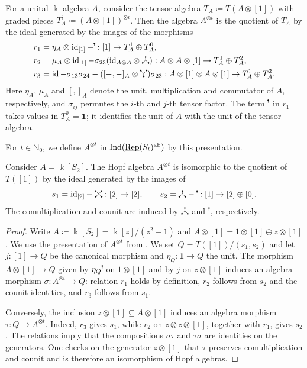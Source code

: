 \documentclass[11pt]{amsart}
\newcommand{\pd}[2][black]{\filldraw[#1] (#2) circle (1.5pt)} %
\newcommand\crossing{\tikz[baseline=(origin.base),scale=0.5]{
    \coordinate (origin) at (0,0); %
    \pd{0,0}; \pd{.5,0}; \pd{0,.5}; \pd{.5,.5};
    \draw (0,0) -- (.5,.5);
    \draw (.5,0) -- (0,.5);
}}
\newcommand\mult{\tikz[baseline=(origin.base),scale=0.5]{
    \coordinate (origin) at (0,0); %
    \pd{.25,0}; \pd{0,.5}; \pd{.5,.5};
    \draw (.25,0) -- (.25,.25) -- (0,.5);
    \draw (.25,.25) -- (.5,.5);
}}
\newcommand\comult{\tikz[baseline=(origin.base),scale=0.5]{
    \coordinate (origin) at (0,0); %
    \pd{.25,.5}; \pd{0,0}; \pd{.5,0};
    \draw (.25,.5) -- (.25,.25) -- (0,0);
    \draw (.25,.25) -- (.5,0);
}}
\newcommand\upperdots[1]{\tikz[baseline=(origin.base),scale=0.5]{
    \coordinate (origin) at (0,0);
    \foreach \i in {0,...,\numexpr#1-1\relax} {
        \pd{0.5*\i,.5};
        \draw (0.5*\i,.3) -- (0.5*\i,.5);
    }
}}
\newcommand\Cref[1]{\zcref[S]{#1}}
\theoremstyle{definition}
\theoremstyle{remark}
\newcommand\kk{\Bbbk}
\newcommand\uRep{\underline{\smash{\operatorname{Rep}}}}
\newcommand\id{\operatorname{id}}
\newcommand\Ind{\operatorname{Ind}}
\renewcommand\:\colon
\renewcommand\o\otimes
\newcommand\one{\mathbf{1}}
\newcommand\NN{\mathbb N}
\renewcommand\o\otimes
\renewcommand\:\colon
\newcommand\ab{^{\mathrm{ab}}}
\begin{document}
\begin{proposition} \label{p:gens-rels-tth-power}
    For a unital $\kk$-algebra $A$, consider the tensor algebra $T_A \coloneqq T(A \o [1])$ with graded pieces $T_A^i \coloneqq (A \o [1])^{\o i}$. Then
    the algebra $A^{\o t}$ is the quotient of $T_A$ by the ideal generated by the images of the morphisms
    \[\begin{aligned}
        &r_1 = \eta_A\o\id_{[1]}-\upperdots{1}: [1]\to T_A^1\oplus T_A^0, \\
        &r_2 = \mu_A \o \id_{[1]} - \sigma_{23}(\id_{A \o A} \o \;\comult) : A \o A \o [1] \to T_A^1 \oplus T_A^2, \\
        &r_3 = \id - \sigma_{13}\sigma_{24} - ([-,-]_A \o \mult)\sigma_{23} : A \o [1] \o A \o [1] \to T_A^1 \oplus T_A^2.
    \end{aligned}\]
    Here $\eta_A$, $\mu_A$ and $[,]_A$ denote the unit, multiplication and commutator of $A$, respectively, and $\sigma_{ij}$ permutes the $i$-th and $j$-th tensor factor. The term $\upperdots{1}$ in $r_1$ takes values in $T_A^0=\one$; it identifies the unit of $A$ with the unit of the tensor algebra.
\end{proposition}

For $t\in\NN_0$, we define $A^{\o t}$ in $\Ind(\uRep(S_t)\ab)$ by this presentation.

\begin{lemma} \label{l:gens-rels-ks2-otimes-t}
    Consider $A = \kk[S_2]$. The Hopf algebra $A^{\o t}$ is isomorphic to the quotient of $T([1])$ by the ideal generated by the images of
    \[
        s_1 = \id_{[2]} - \;\crossing: [2] \to [2], \qquad s_2 = \comult - \upperdots{1}: [1] \to [2] \oplus [0].
    \]
    The comultiplication and counit are induced by $\comult$ and $\upperdots{1}$, respectively.
\end{lemma}
\begin{proof}
    Write $A \coloneqq \kk[S_2] = \kk[z]/(z^2-1)$ and $A \o [1] = 1 \o [1] \oplus z \o [1]$. We use the presentation of $A^{\o t}$ from \Cref{p:gens-rels-tth-power}. We set $Q=T([1])/(s_1,s_2)$ and let $j:[1]\to Q$ be the canonical morphism and $\eta_Q\:\one\to Q$ the unit. The morphism $A\o[1]\to Q$ given by $\eta_Q\upperdots{1}$ on $1\o[1]$ and by $j$ on $z\o[1]$ induces an algebra morphism $\sigma:A^{\o t}\to Q$: relation $r_1$ holds by definition, $r_2$ follows from $s_2$ and the counit identities, and $r_3$ follows from $s_1$.

    Conversely, the inclusion $z\o[1]\subseteq A\o[1]$ induces an algebra morphism $\tau:Q\to A^{\o t}$. Indeed, $r_3$ gives $s_1$, while $r_2$ on $z\o z\o[1]$, together with $r_1$, gives $s_2$. The relations imply that the compositions $\sigma\tau$ and $\tau\sigma$ are identities on the generators.    
    One checks on the generator $z\o[1]$ that $\tau$ preserves comultiplication and counit and is therefore an isomorphism of Hopf algebras.
\end{proof}
\end{document}
